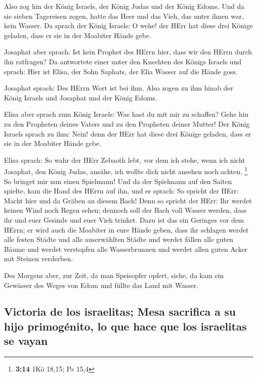  Also zog hin der König Israels, der König Judas und der
König Edoms. Und da sie sieben Tagereisen zogen, hatte das Heer und das
Vieh, das unter ihnen war, kein Wasser.  Da sprach der
König Israels: O wehe! der HErr hat diese drei Könige geladen, dass er
sie in der Moabiter Hände gebe.

 Josaphat aber sprach: Ist kein Prophet des HErrn hier,
dass wir den HErrn durch ihn ratfragen? Da antwortete einer unter den
Knechten des Königs Israels und sprach: Hier ist Elisa, der Sohn
Saphats, der Elia Wasser auf die Hände goss.

 Josaphat sprach: Des HErrn Wort ist bei ihm. Also zogen
zu ihm hinab der König Israels und Josaphat und der König Edoms.

 Elisa aber sprach zum König Israels: Was hast du mit mir
zu schaffen? Gehe hin zu den Propheten deines Vaters und zu den
Propheten deiner Mutter! Der König Israels sprach zu ihm: Nein! denn der
HErr hat diese drei Könige geladen, dass er sie in der Moabiter Hände
gebe.

 Elisa sprach: So wahr der HErr Zebaoth lebt, vor dem ich
stehe, wenn ich nicht Josaphat, den König Judas, ansähe, ich wollte dich
nicht ansehen noch achten. \footnote{\textbf{3:14} 1Kö 18,15; Ps 15,4}
 So bringet mir nun einen Spielmann! Und da der Spielmann
auf den Saiten spielte, kam die Hand des HErrn auf ihn, 
und er sprach: So spricht der HErr: Macht hier und da Gräben an diesem
Bach!  Denn so spricht der HErr: Ihr werdet keinen Wind
noch Regen sehen; dennoch soll der Bach voll Wasser werden, dass ihr und
euer Gesinde und euer Vieh trinket.  Dazu ist das ein
Geringes vor dem HErrn; er wird auch die Moabiter in eure Hände geben,
 dass ihr schlagen werdet alle festen Städte und alle
auserwählten Städte und werdet fällen alle guten Bäume und werdet
verstopfen alle Wasserbrunnen und werdet allen guten Acker mit Steinen
verderben.

 Des Morgens aber, zur Zeit, da man Speisopfer opfert,
siehe, da kam ein Gewässer des Weges von Edom und füllte das Land mit
Wasser.

\hypertarget{victoria-de-los-israelitas-mesa-sacrifica-a-su-hijo-primoguxe9nito-lo-que-hace-que-los-israelitas-se-vayan}{%
\subsection{Victoria de los israelitas; Mesa sacrifica a su hijo
primogénito, lo que hace que los israelitas se
vayan}\label{victoria-de-los-israelitas-mesa-sacrifica-a-su-hijo-primoguxe9nito-lo-que-hace-que-los-israelitas-se-vayan}}


